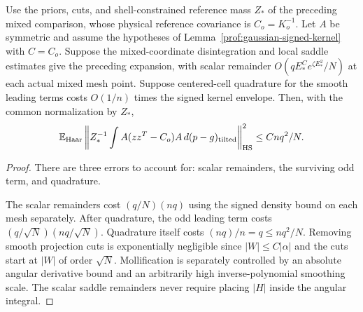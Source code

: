 \begin{corollary}\label{prof:weighted-kernel-transfer}
Use the priors, cuts, and shell-constrained reference mass $Z_*$
of the preceding mixed comparison, whose physical reference covariance
is $C_o=K_o^{-1}$. Let $A$ be symmetric and assume the hypotheses of
Lemma~\ref{prof:gaussian-signed-kernel} with $C=C_o$.
Suppose the mixed-coordinate disintegration and local saddle
estimates give the preceding expansion, with scalar remainder
$O(qE_*^Ce^{\zeta E_*^2}/N)$ at each actual mixed mesh point.
Suppose centered-cell quadrature for the smooth leading terms
costs $O(1/n)$ times the signed kernel envelope. Then, with the
common normalization by $Z_*$,
\[
 \mathbb E_{\rm Haar}\left\|
 Z_*^{-1}\int A(zz^T-C_o)A\,d(p-g)_{\rm tilted}
 \right\|_{\rm HS}^2\le Cnq^2/N.
\]
\end{corollary}
\begin{proof}
There are three errors to account for: scalar remainders, the surviving
odd term, and quadrature.

The scalar remainders cost $(q/N)(nq)$ using
the signed density bound on each mesh separately. After quadrature, the odd leading
term costs $(q/\sqrt N)(nq/\sqrt N)$. Quadrature itself costs
$(nq)/n=q\le nq^2/N$. Removing smooth projection cuts is
exponentially negligible since $|W|\le C|\alpha|$ and the cuts
start at $|W|$ of order $\sqrt N$. Mollification is separately
controlled by an absolute angular derivative bound and an
arbitrarily high inverse-polynomial smoothing scale. The scalar
saddle remainders never require placing $|H|$ inside the angular
integral.
\end{proof}

